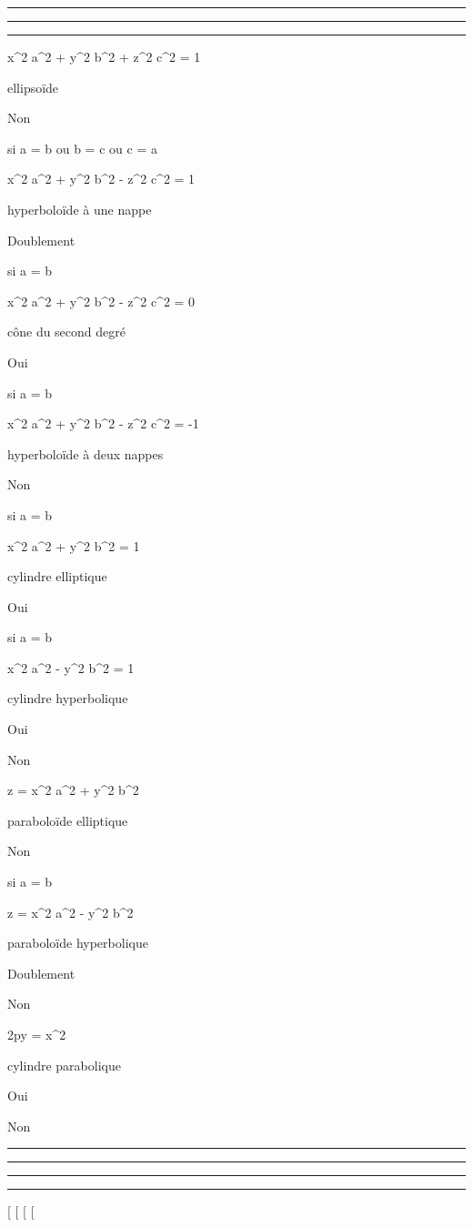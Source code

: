 \documentclass[]{article}
\begin{document}
\begin{center}\rule{3in}{0.4pt}\end{center}

\begin{center}\rule{3in}{0.4pt}\end{center}

\begin{center}\rule{3in}{0.4pt}\end{center}

 x^2 \over a^2 +
y^2 \over b^2 + z^2
\over c^2 = 1

ellipsoïde

Non

si a = b ou b = c ou c = a

 x^2 \over a^2 +
y^2 \over b^2 - z^2
\over c^2 = 1

hyperboloïde à une nappe

Doublement

si a = b

 x^2 \over a^2 +
y^2 \over b^2 - z^2
\over c^2 = 0

cône du second degré

Oui

si a = b

 x^2 \over a^2 +
y^2 \over b^2 - z^2
\over c^2 = -1

hyperboloïde à deux nappes

Non

si a = b

 x^2 \over a^2 +
y^2 \over b^2 = 1

cylindre elliptique

Oui

si a = b

 x^2 \over a^2 -
y^2 \over b^2 = 1

cylindre hyperbolique

Oui

Non

z = x^2 \over a^2 +
y^2 \over b^2

paraboloïde elliptique

Non

si a = b

z = x^2 \over a^2 -
y^2 \over b^2

paraboloïde hyperbolique

Doublement

Non

2py = x^2

cylindre parabolique

Oui

Non

\begin{center}\rule{3in}{0.4pt}\end{center}

\begin{center}\rule{3in}{0.4pt}\end{center}

\begin{center}\rule{3in}{0.4pt}\end{center}

\begin{center}\rule{3in}{0.4pt}\end{center}

[
[
[
[
\end{document}
